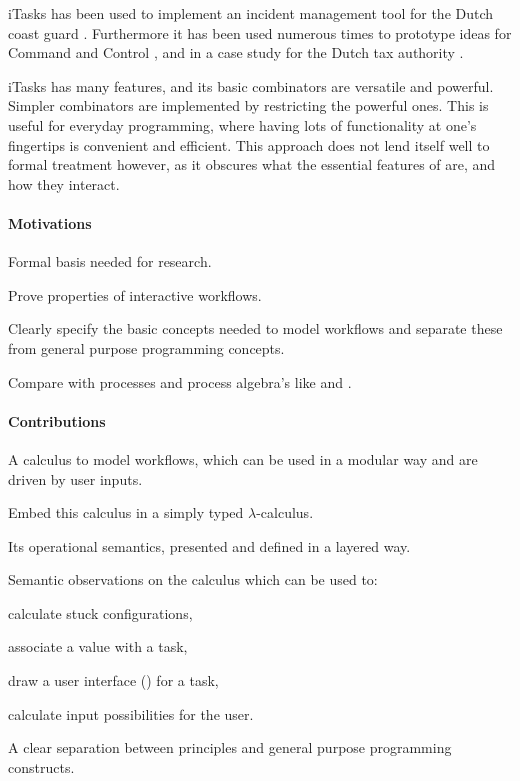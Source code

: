 iTasks has been used to implement an incident management tool for the Dutch coast guard \cite{conf/iscram/LijnseJP12}.
Furthermore it has been used numerous times to prototype ideas for Command and Control \cite{theses/nlda/Kool17, theses/radboud/Stutterheim17}, and in a case study for the Dutch tax authority \cite{conf/sfp/StutterheimAP17}.

iTasks has many features, and its basic combinators are versatile and powerful.
Simpler combinators are implemented by restricting the powerful ones.
This is useful for everyday programming, where having lots of functionality at one's fingertips is convenient and efficient.
This approach does not lend itself well to formal treatment however, as it obscures what the essential features of \TOP are, and how they interact.



\paragraph{Motivations}
\begin{itemize*}
  \item Formal basis needed for research.
  \item Prove properties of interactive workflows.
  \item Clearly specify the basic concepts needed to model workflows
    and separate these from general purpose programming concepts.
  \item Compare \TOP with processes and process algebra's like \CSP and \CCS.
\end{itemize*}


\paragraph{Contributions}
\begin{itemize*}
  \item A calculus to model workflows, which can be used in a modular way and are driven by user inputs.
  \item Embed this calculus in a simply typed $\lambda$-calculus.
  \item Its operational semantics, presented and defined in a layered way.
  \item Semantic observations on the calculus which can be used to:
  \begin{itemize*}
    \item calculate stuck configurations,
    \item associate a value with a task,
    \item draw a user interface (\UI) for a task,
    \item calculate input possibilities for the user.
  \end{itemize*}
  \item A clear separation between \TOP principles and general purpose programming constructs.
\end{itemize*}


